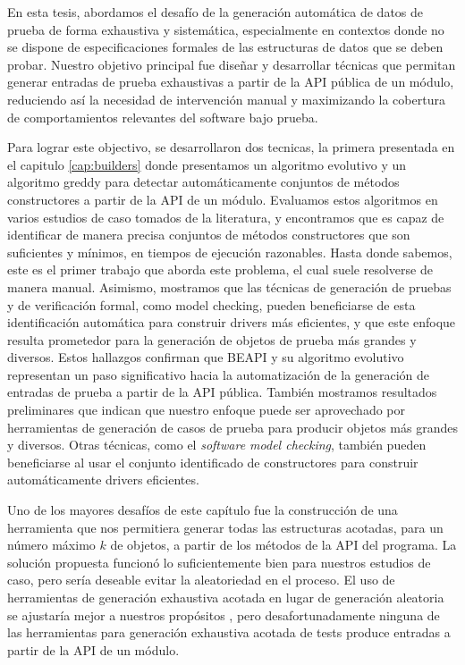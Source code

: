 En esta tesis, abordamos el desafío de la generación automática de datos de prueba de forma exhaustiva y sistemática, 
especialmente en contextos donde no se dispone de especificaciones formales de las estructuras de datos que se deben probar. 
Nuestro objetivo principal fue diseñar y desarrollar técnicas que permitan generar entradas de prueba exhaustivas a partir de la API pública de un módulo, reduciendo 
así la necesidad de intervención manual y maximizando la cobertura de comportamientos relevantes del software bajo prueba.

Para lograr este objectivo, se desarrollaron dos tecnicas,
la primera presentada en el capitulo \ref{cap:builders} donde presentamos un algoritmo evolutivo y un algoritmo greddy para detectar automáticamente conjuntos de métodos constructores a partir de la API de un módulo. 
Evaluamos estos algoritmos en varios estudios de caso tomados de la literatura, 
y encontramos que es capaz de identificar de manera precisa conjuntos de métodos constructores que son suficientes y mínimos, 
en tiempos de ejecución razonables. Hasta donde sabemos, este es el primer trabajo que aborda este problema, el cual suele resolverse de manera manual.
Asimismo, mostramos que las técnicas de generación de pruebas y de verificación formal, como model checking, pueden beneficiarse de esta identificación automática para construir drivers más eficientes, 
y que este enfoque resulta prometedor para la generación de objetos de prueba más grandes y diversos. 
Estos hallazgos confirman que BEAPI y su algoritmo evolutivo representan un paso significativo hacia la automatización de la generación de entradas de prueba a partir de la API pública.
También mostramos resultados preliminares que indican que nuestro enfoque puede ser aprovechado por herramientas de generación de casos de prueba para producir objetos más grandes y diversos. 
Otras técnicas, como el \emph{software model checking}, también pueden beneficiarse al usar el conjunto identificado de constructores para construir automáticamente drivers eficientes.

Uno de los mayores desafíos de este capítulo fue la construcción de una herramienta que nos permitiera generar todas las estructuras acotadas, 
para un número máximo $k$ de objetos, a partir de los métodos de la API del programa. La solución propuesta funcionó lo suficientemente bien para nuestros estudios de caso, 
pero sería deseable evitar la aleatoriedad en el proceso. El uso de herramientas de generación exhaustiva acotada en lugar de generación aleatoria se ajustaría mejor a nuestros propósitos \cite{Boyapati02}, 
pero desafortunadamente ninguna de las herramientas para generación exhaustiva acotada de tests produce entradas a partir de la API de un módulo.

